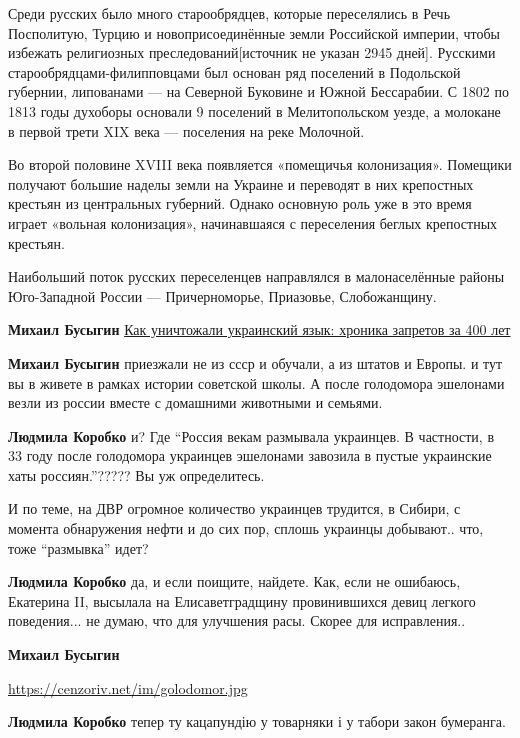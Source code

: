 \begin{itemize}
{\begin{itemize}
Среди русских было много старообрядцев, которые переселялись в Речь Посполитую,
Турцию и новоприсоединённые земли Российской империи, чтобы избежать
религиозных преследований[источник не указан 2945 дней]. Русскими
старообрядцами-филипповцами был основан ряд поселений в Подольской губернии,
липованами — на Северной Буковине и Южной Бессарабии. С 1802 по 1813 годы
духоборы основали 9 поселений в Мелитопольском уезде, а молокане в первой трети
XIX века — поселения на реке Молочной.

Во второй половине XVIII века появляется «помещичья колонизация». Помещики
получают большие наделы земли на Украине и переводят в них крепостных крестьян
из центральных губерний. Однако основную роль уже в это время играет «вольная
колонизация», начинавшаяся с переселения беглых крепостных крестьян.

Наибольший поток русских переселенцев направлялся в малонаселённые районы
Юго-Западной России — Причерноморье, Приазовье, Слобожанщину.

\textbf{Михаил Бусыгин}
\href{https://argumentua.com/stati/kak-unichtozhali-ukrainskii-yazyk-khronika-zapretov-za-400-let}%
{Как уничтожали украинский язык: хроника запретов за 400 лет}

\textbf{Михаил Бусыгин} приезжали не из ссср и обучали, а из штатов и Европы. и тут вы в
живете в рамках истории советской школы. А после голодомора эшелонами везли из
россии вместе с домашними животными и семьями.

\textbf{Людмила Коробко} 
и? Где \enquote{Россия векам размывала украинцев. В частности, в 33 году после
голодомора украинцев эшелонами завозила в пустые украинские хаты россиян.}?????
Вы уж определитесь.

И по теме, на ДВР огромное количество украинцев трудится, в Сибири, с момента
обнаружения нефти и до сих пор, сплошь украинцы добывают.. что, тоже
\enquote{размывка} идет?


\textbf{Людмила Коробко} да, и если поищите, найдете. Как, если не ошибаюсь,
Екатерина II, высылала на Елисаветградщину провинившихся девиц легкого
поведения... не думаю, что для улучшения расы. Скорее для исправления..

\textbf{Михаил Бусыгин} 

\url{https://cenzoriv.net/im/golodomor.jpg}

\textbf{Людмила Коробко} тепер ту кацапундію у товарняки і у табори закон
бумеранга.


\end{itemize}}
\end{itemize}

